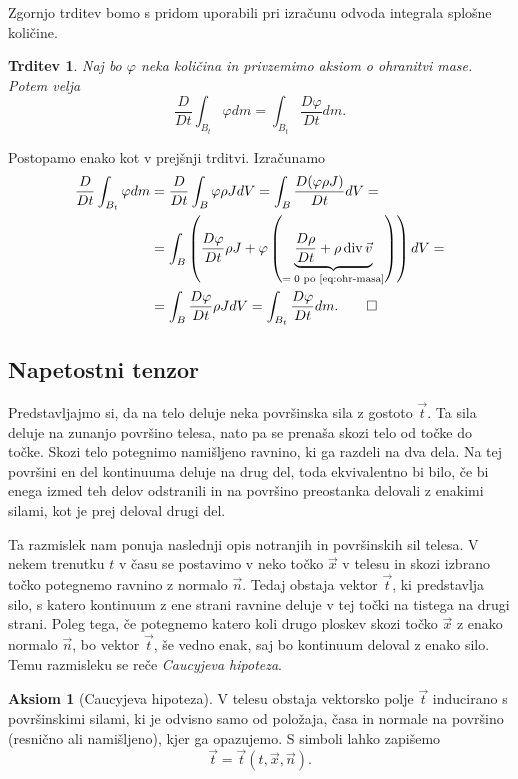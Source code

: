 \documentclass[a4paper,twoside]{article}
\theoremstyle{definition} %
\newtheorem{aksiom}{Aksiom}
\theoremstyle{plain} %
\newtheorem{trditev}[definicija]{Trditev}
\numberwithin{equation}{section}
\renewcommand{\div}{\operatorname{div}}
\renewcommand{\phi}{\varphi}
\newcommand{\DD}[2]{\ensuremath{\frac{D #1}{D #2}}}
\newcommand{\DDt}[1]{\DD{#1}{t}}
\newcommand{\vv}{\vec{v}}
\newcommand{\vt}{\vec{t}}
\newcommand{\vn}{\vec{n}}
\newcommand{\vx}{\vec{x}}
\begin{document}
Zgornjo trditev bomo s pridom uporabili pri izračunu odvoda integrala splošne
količine.
\begin{trditev}
  \label{trd:swap-der-int}
  Naj bo $\phi$ neka količina in privzemimo aksiom o ohranitvi mase. Potem
  velja
  \begin{equation}
    \DDt{} \int_{B_t}\phi dm = \int_{B_t} \DDt{\phi} dm.
    \label{eq:swap-der-int}
  \end{equation}
\end{trditev}
\proof
Postopamo enako kot v prejšnji trditvi. Izračunamo
\begin{align*}
    \DDt{} \int_{B_t}\phi dm &=
    \DDt{} \int_{B}\phi \rho J dV =
    \int_{B} \DDt{(\phi \rho J)} dV  = \\ &=
  \int_{B} \left(\DDt{\phi} \rho J + \phi \left(\underbrace{\DDt{\rho} + \rho
  \div \vv}_{=\;0 \text{ po \eqref{eq:ohr-masa}}} \right) \right)dV  = \\ &=
  \int_{B} \DDt{\phi} \rho JdV =
  \int_{B_t} \DDt{\phi} dm. \qedhere
\end{align*}
\endproof

\subsection{Napetostni tenzor}
Predstavljajmo si, da na telo deluje neka površinska sila z gostoto $\vt$. Ta sila deluje
na zunanjo površino telesa, nato pa se prenaša skozi telo od točke do točke.
Skozi telo potegnimo namišljeno ravnino, ki ga razdeli na dva dela.
Na tej površini en del kontinuuma deluje na drug del, toda ekvivalentno bi bilo,
če bi enega izmed teh delov odstranili in na površino preostanka delovali z
enakimi silami, kot je prej deloval drugi del.

Ta razmislek nam ponuja naslednji opis notranjih in površinskih sil telesa.
V nekem trenutku $t$ v času se postavimo v neko točko $\vx$ v telesu in skozi izbrano
točko potegnemo ravnino z normalo $\vn$. Tedaj obstaja vektor $\vt$, ki
predstavlja silo, s katero kontinuum z ene strani ravnine deluje v tej točki na
tistega na drugi strani. Poleg tega, če potegnemo katero koli drugo ploskev
skozi točko $\vx$ z enako normalo $\vn$, bo vektor $\vt$, še vedno enak, saj bo
kontinuum deloval z enako silo. Temu razmisleku se reče \emph{Caucyjeva
hipoteza}.

\begin{aksiom}[Caucyjeva hipoteza]
  V telesu obstaja vektorsko polje $\vt$ inducirano s površinskimi silami, ki
  je odvisno samo od položaja, časa in normale na površino (resnično ali
  namišljeno), kjer ga opazujemo.  S simboli lahko zapišemo
  \[
    \vt = \vt(t, \vx, \vn).
  \]
\end{aksiom}
\end{document}
